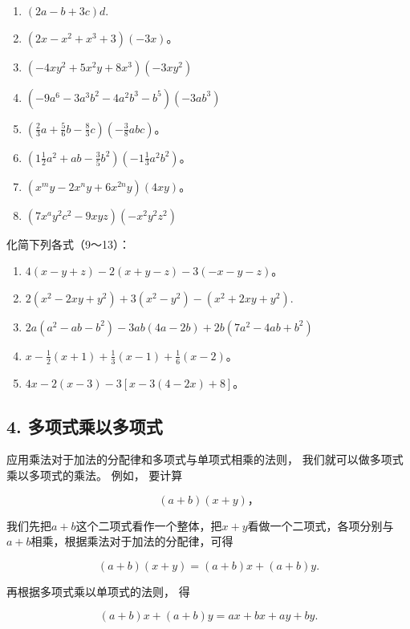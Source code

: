 \begin{enumerate}[start=1]
\item
  \((2a - b + 3c)d.\)
\item
  \((2x - x^{2} + x^{3} + 3)(-3x)\)。
\item
  \((-4xy^{2} + 5x^{2}y + 8x^{3})(-3xy^{2})\)
\item
  \((-9a^{6} - 3a^{3}b^{2} - 4a^{2}b^{3} - b^{5})(-3ab^{3})\)
\item
  \(\left(\frac{2}{3} a + \frac{5}{6} b - \frac{8}{3} c\right)\left(-\frac{3}{8} abc\right)\)。
\item
  \(\left(1\frac{1}{2} a^2 + a b - \frac{3}{5} b^2\right)\left(-1\frac{1}{3} a^2 b^2\right)\)。
\item
  \((x^{m}y - 2x^{n}y + 6x^{2n}y)(4xy)\)。
\item
  \((7x^{a}y^{2}c^{2} - 9xyz)(-x^{2}y^{2}z^{2})\)
\end{enumerate}

化简下列各式（9～13）：

\begin{enumerate}[start=9]
\item
  \(4(x - y + z) - 2(x + y - z) - 3(-x - y - z)\)。
\item
  \(2(x^{2} - 2xy + y^{2}) + 3(x^{2} - y^{2}) - (x^{2} + 2xy + y^{2}).\)
\item
  \(2a(a^{2} - ab - b^{2}) - 3ab(4a - 2b) + 2b(7a^{2} - 4ab + b^{2})\)
\item
  \(x - \frac{1}{2} (x + 1) + \frac{1}{3} (x - 1) + \frac{1}{6} (x - 2)\)。
\item
  \(4x - 2(x - 3) - 3[x - 3(4 - 2x) + 8]\)。
\end{enumerate}

\subsection{4. 多项式乘以多项式}

应用乘法对于加法的分配律和多项式与单项式相乘的法则，
我们就可以做多项式乘以多项式的乘法。 例如， 要计算

\[
(a + b) (x + y)\text{，}
\]

我们先把\(a + b\)这个二项式看作一个整体，把\(x + y\)看做一个二项式，各项分别与\(a + b\)相乘，根据乘法对于加法的分配律，可得

\[
(a + b) (x + y) = (a + b) x + (a + b) y.
\]

再根据多项式乘以单项式的法则， 得

\[
(a + b) x + (a + b) y = a x + b x + a y + b y.
\]


